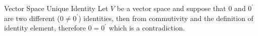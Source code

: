 \begin{proposition}{Vector Space Unique Identity}
  Let $ V$ be a vector space and suppose that $ 0 $ and $ 0 ^{\prime} $ are two different ($ 0 \neq  0 ^{\prime} $) identities, then 
  from commutivity and the definition of identity element, therefore $ 0 =  0 ^{\prime} $ which is a contradiction.
\end{proposition}
